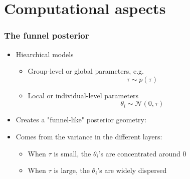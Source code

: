 \documentclass[10pt]{beamer}
\begin{document}





\section{Computational aspects}
\frame{\sectionpage}

\begin{frame}
\frametitle{The funnel posterior }

  \begin{itemize}
  \item Hiearchical models
  \begin{itemize}
  \item Group-level or global parameters, e.g.
  \[
  \tau \sim p(\tau)
  \]
  \item Local or individual-level parameters
  \[
  \theta_i \sim \mathcal{N}(0, \tau)
  \]
  \end{itemize}
  \item Creates a "funnel-like" posterior geometry:
  \item Comes from the variance in the different layers:
  \begin{itemize}
  \item When $\tau$ is small, the $\theta_i$'s are concentrated around 0
  \item When $\tau$ is large, the $\theta_i$'s are widely dispersed
  \end{itemize}
  \end{itemize}
\end{frame}
\end{document}
